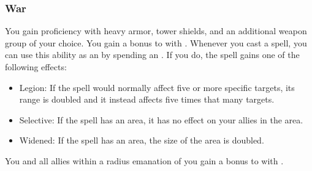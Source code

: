         \subsubsection{War}
             You gain proficiency with heavy armor, tower shields, and an additional weapon group of your choice.
             You gain a  bonus to  with .
             Whenever you cast a spell, you can use this ability as an  by spending an .
            If you do, the spell gains one of the following effects:
            \begin{itemize}
                \item Legion: If the spell would normally affect five or more specific targets, its range is doubled and it instead affects five times that many targets.
                \item Selective: If the spell has an area, it has no effect on your allies in the area.
                \item Widened: If the spell has an area, the size of the area is doubled.
            \end{itemize}
             You and all allies within a \arealarge radius emanation of you gain a  bonus to  with .

